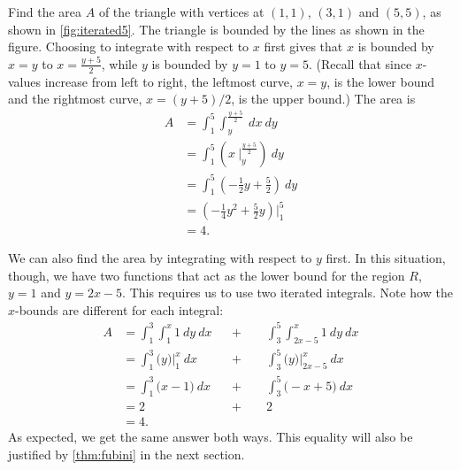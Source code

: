 \begin{example}\label{ex_iterated5}
Find the area $A$ of the triangle with vertices at $(1,1)$, $(3,1)$ and $(5,5)$, as shown in \autoref{fig:iterated5}.
%
\solution
The triangle is bounded by the lines as shown in the figure. Choosing to integrate with respect to $x$ first gives that $x$ is bounded by $x=y$ to $x = \frac{y+5}2$, while $y$ is bounded by $y=1$ to $y=5$. (Recall that since $x$-values increase from left to right, the leftmost curve, $x=y$, is the lower bound and the rightmost curve, $x=(y+5)/2$, is the upper bound.) The area is
\begin{align*}
A &= \int_1^5\int_{y}^{\frac{y+5}2}\ dx\ dy \\
 &= \int_1^5\left(x\ \Big|_y^{\frac{y+5}2}\right)\ dy \\
&= \int_1^5 \left(-\frac12y+\frac52\right)\ dy \\
&= \left(-\frac14y^2+\frac52y\right)\Big|_1^5\\
&=4.
\end{align*}

We can also find the area by integrating with respect to $y$ first. In this situation, though, we have two functions that act as the lower bound for the region $R$, $y=1$ and $y=2x-5$. This requires us to use two iterated integrals. Note how the $x$-bounds are different for each integral:
\begin{align*}
 A
 &= \int_1^3\int_1^x 1\ dy \ dx &&+\qquad\int_3^5\int_{2x-5}^x1\ dy\ dx\\
 &= \int_1^3\bigl(y\bigr)\Big|_1^x\ dx &&+\qquad\int_3^5\bigl(y\bigr)\Big|_{2x-5}^x\ dx\\
 &= \int_1^3\bigl(x-1\bigr)\ dx &&+\qquad\int_3^5\bigl(-x+5\bigr)\ dx \\
 &= 2 &&+\qquad2 \\
 &=4.
\end{align*}
As expected, we get the same answer both ways.  This equality will also be justified by \autoref{thm:fubini} in the next section.
\end{example}

